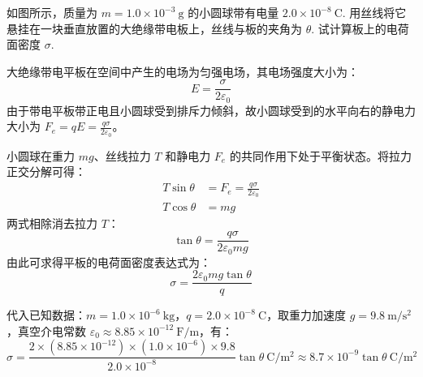 \begin{exercise}\label{ex:15.8}
如图所示，质量为 $m = 1.0 \times 10^{-3} \ \mathrm{g}$ 的小圆球带有电量 $2.0 \times 10^{-8} \ \mathrm{C}$. 用丝线将它悬挂在一块垂直放置的大绝缘带电板上，丝线与板的夹角为 $\theta$. 试计算板上的电荷面密度 $\sigma$.
\begin{center}
\end{center}
\end{exercise}
\begin{solution}
大绝缘带电平板在空间中产生的电场为匀强电场，其电场强度大小为：
$$ E = \frac{\sigma}{2\varepsilon_0} $$
由于带电平板带正电且小圆球受到排斥力倾斜，故小圆球受到的水平向右的静电力大小为 $F_e = qE = \frac{q\sigma}{2\varepsilon_0}$。

小圆球在重力 $mg$、丝线拉力 $T$ 和静电力 $F_e$ 的共同作用下处于平衡状态。将拉力正交分解可得：
\begin{align*}
    T \sin\theta &= F_e = \frac{q\sigma}{2\varepsilon_0} \\
    T \cos\theta &= mg
\end{align*}
两式相除消去拉力 $T$：
$$ \tan\theta = \frac{q\sigma}{2\varepsilon_0 mg} $$
由此可求得平板的电荷面密度表达式为：
$$ \sigma = \frac{2\varepsilon_0 mg \tan\theta}{q} $$

代入已知数据：$m = 1.0 \times 10^{-6} \ \mathrm{kg}$，$q = 2.0 \times 10^{-8} \ \mathrm{C}$，取重力加速度 $g = 9.8 \ \mathrm{m/s^2}$，真空介电常数 $\varepsilon_0 \approx 8.85 \times 10^{-12} \ \mathrm{F/m}$，有：
$$ \sigma = \frac{2 \times (8.85 \times 10^{-12}) \times (1.0 \times 10^{-6}) \times 9.8}{2.0 \times 10^{-8}} \tan\theta \ \mathrm{C/m^2} \approx 8.7 \times 10^{-9} \tan\theta \ \mathrm{C/m^2} $$
\end{solution}

